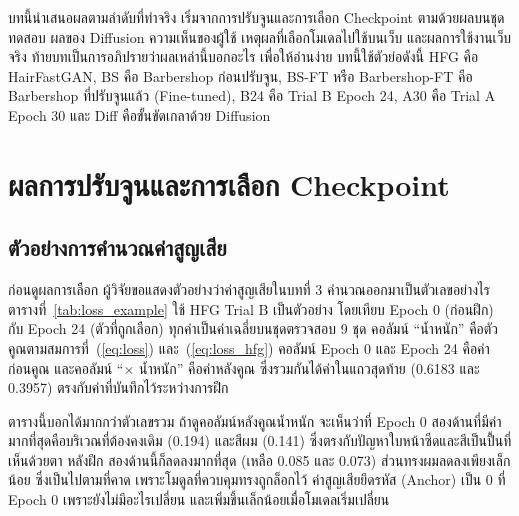 
บทนี้นำเสนอผลตามลำดับที่ทำจริง เริ่มจากการปรับจูนและการเลือก Checkpoint
ตามด้วยผลบนชุดทดสอบ ผลของ Diffusion ความเห็นของผู้ใช้ เหตุผลที่เลือกโมเดลไปใช้บนเว็บ
และผลการใช้งานเว็บจริง ท้ายบทเป็นการอภิปรายว่าผลเหล่านี้บอกอะไร
เพื่อให้อ่านง่าย บทนี้ใช้ตัวย่อดังนี้ HFG คือ HairFastGAN, BS คือ Barbershop ก่อนปรับจูน,
BS-FT หรือ Barbershop-FT คือ Barbershop ที่ปรับจูนแล้ว (Fine-tuned), B24 คือ Trial B Epoch 24,
A30 คือ Trial A Epoch 30 และ Diff คือขั้นขัดเกลาด้วย Diffusion

\section{ผลการปรับจูนและการเลือก Checkpoint}

\subsection{ตัวอย่างการคำนวณค่าสูญเสีย}

ก่อนดูผลการเลือก ผู้วิจัยขอแสดงตัวอย่างว่าค่าสูญเสียในบทที่ 3 คำนวณออกมาเป็นตัวเลขอย่างไร
ตารางที่~\ref{tab:loss_example} ใช้ HFG Trial B เป็นตัวอย่าง โดยเทียบ Epoch 0 (ก่อนฝึก) กับ Epoch 24 (ตัวที่ถูกเลือก)
ทุกค่าเป็นค่าเฉลี่ยบนชุดตรวจสอบ 9 ชุด คอลัมน์ ``น้ำหนัก'' คือตัวคูณตามสมการที่~(\ref{eq:loss}) และ~(\ref{eq:loss_hfg})
คอลัมน์ Epoch 0 และ Epoch 24 คือค่าก่อนคูณ และคอลัมน์ ``$\times$ น้ำหนัก'' คือค่าหลังคูณ
ซึ่งรวมกันได้ค่าในแถวสุดท้าย (0.6183 และ 0.3957) ตรงกับค่าที่บันทึกไว้ระหว่างการฝึก

ตารางนี้บอกได้มากกว่าตัวเลขรวม ถ้าดูคอลัมน์หลังคูณน้ำหนัก จะเห็นว่าที่ Epoch 0
สองด้านที่มีค่ามากที่สุดคือบริเวณที่ต้องคงเดิม (0.194) และสีผม (0.141) ซึ่งตรงกับปัญหาใบหน้าซีดและสีเป็นปื้นที่เห็นด้วยตา
หลังฝึก สองด้านนี้ก็ลดลงมากที่สุด (เหลือ 0.085 และ 0.073) ส่วนทรงผมลดลงเพียงเล็กน้อย
ซึ่งเป็นไปตามที่คาด เพราะโมดูลที่ควบคุมทรงถูกล็อกไว้
ค่าสูญเสียยึดรหัส (Anchor) เป็น 0 ที่ Epoch 0 เพราะยังไม่มีอะไรเปลี่ยน และเพิ่มขึ้นเล็กน้อยเมื่อโมเดลเริ่มเปลี่ยน

